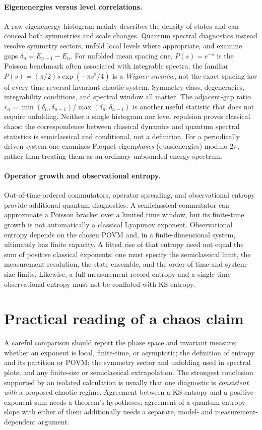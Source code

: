 \documentclass[11pt,a4paper]{article}
\begin{document}
\paragraph{Eigenenergies versus level correlations.} A raw eigenenergy histogram mainly describes the density of states and can conceal both symmetries and scale changes. Quantum spectral diagnostics instead resolve symmetry sectors, unfold local levels where appropriate, and examine gaps $\delta_n=E_{n+1}-E_n$. For unfolded mean spacing one, $P(s)=e^{-s}$ is the Poisson benchmark often associated with integrable spectra; the familiar $P(s)=(\pi/2)s\exp(-\pi s^2/4)$ is a \emph{Wigner surmise}, not the exact spacing law of every time-reversal-invariant chaotic system. Symmetry class, degeneracies, integrability conditions, and spectral window all matter. The adjacent-gap ratio $r_n=\min(\delta_n,\delta_{n-1})/\max(\delta_n,\delta_{n-1})$ is another useful statistic that does not require unfolding. Neither a single histogram nor level repulsion proves classical chaos: the correspondence between classical dynamics and quantum spectral statistics is semiclassical and conditional, not a definition. For a periodically driven system one examines Floquet eigen\emph{phases} (quasienergies) modulo $2\pi$, rather than treating them as an ordinary unbounded energy spectrum.

\paragraph{Operator growth and observational entropy.} Out-of-time-ordered commutators, operator spreading, and observational entropy provide additional quantum diagnostics. A semiclassical commutator can approximate a Poisson bracket over a limited time window, but its finite-time growth is not automatically a classical Lyapunov exponent. Observational entropy depends on the chosen POVM and, in a finite-dimensional system, ultimately has finite capacity. A fitted rise of that entropy need not equal the sum of positive classical exponents: one must specify the semiclassical limit, the measurement resolution, the state ensemble, and the order of time and system-size limits. Likewise, a full measurement-record entropy and a single-time observational entropy must not be conflated with KS entropy.

\section*{Practical reading of a chaos claim}
A careful comparison should report the phase space and invariant measure; whether an exponent is local, finite-time, or asymptotic; the definition of entropy and its partition or POVM; the symmetry sector and unfolding used in spectral plots; and any finite-size or semiclassical extrapolation. The strongest conclusion supported by an isolated calculation is usually that one diagnostic is \emph{consistent with} a proposed chaotic regime. Agreement between a KS entropy and a positive-exponent sum needs a theorem's hypotheses; agreement of a quantum entropy slope with either of them additionally needs a separate, model- and measurement-dependent argument.
\end{document}
